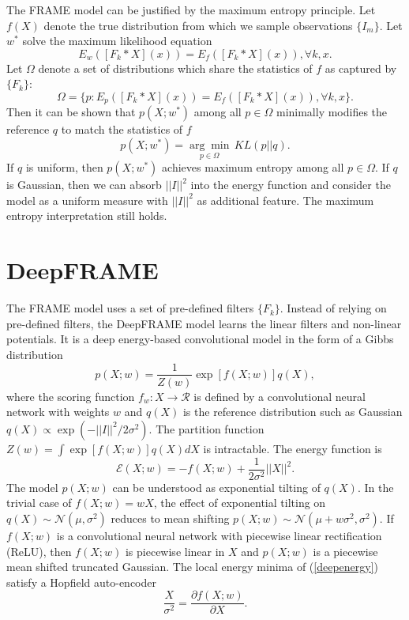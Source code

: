 \documentclass[11pt]{article}
\def\En{\mathcal{E}}
\def\I{X}
\begin{document}
The FRAME model can be justified by the maximum entropy principle. Let $f(\I)$ denote the true distribution from which we sample observations $\{I_m\}$. Let $w^*$ solve the maximum likelihood equation
\begin{equation}
E_w([F_k*\I](x)) = E_f([F_k*\I](x)), \forall k,x.\label{likeeq}
\end{equation}
Let $\Omega$ denote a set of distributions which share the statistics of $f$ as captured by $\{F_k\}$:
\begin{equation}
\Omega = \{p:E_p([F_k*\I](x)) = E_f([F_k*\I](x)), \forall k,x \}.
\end{equation}
Then it can be shown that $p(\I;w^*)$ among all $p\in\Omega$ minimally modifies the reference $q$ to match the statistics of $f$
\begin{equation}
p(\I;w^*) = \underset{p\in\Omega}{\arg\min}\,KL(p||q).
\end{equation}
If $q$ is uniform, then $p(\I;w^*)$ achieves maximum entropy among all $p\in\Omega$. If $q$ is Gaussian, then we can absorb $||I||^2$ into the energy function and consider the model as a uniform measure with $||I||^2$ as additional feature. The maximum entropy interpretation still holds.

\section{DeepFRAME}
The FRAME model uses a set of pre-defined filters $\{F_k\}$. Instead of relying on pre-defined filters, the DeepFRAME \citep{xie} model learns the linear filters and non-linear potentials.
It is a deep energy-based convolutional model in the form of a Gibbs distribution
\begin{equation}
p(\I;w)=\frac{1}{Z(w)}\exp\left[ f(\I;w) \right]q(\I),\label{deepframe}
\end{equation}
where the scoring function $f_w : \I \rightarrow \mathcal{R}$ is defined by a convolutional neural network with weights $w$ and $q(\I)$ is the reference distribution such as Gaussian $q(\I) \propto \exp(-||I||^2/2\sigma^2)$. The partition function $Z(w) = \int \exp\left[ f(\I;w) \right]q(\I) d\I$ is intractable. The energy function is
\begin{equation}
\En(\I;w)=-f(\I;w) + \frac{1}{2\sigma^2}||\I ||^2.\label{deepenergy}
\end{equation}
The model $p(\I;w)$ can be understood as exponential tilting of $q(\I)$. In the trivial case of $f(\I;w)=w\I$, the effect of exponential tilting on $q(\I) \sim \mathcal{N}(\mu,\sigma^2)$ reduces to mean shifting $p(\I;w) \sim \mathcal{N}(\mu+w\sigma^2,\sigma^2)$. If $f(\I;w)$ is a convolutional neural network with piecewise linear rectification (ReLU), then $f(\I;w)$ is piecewise linear in $\I$ and $p(\I;w)$ is a piecewise mean shifted truncated Gaussian. The local energy minima of (\ref{deepenergy}) satisfy a Hopfield auto-encoder
\begin{equation}
\frac{\I}{\sigma^2} = \frac{\partial f(\I;w)}{\partial \I}.
\end{equation}
\end{document}
